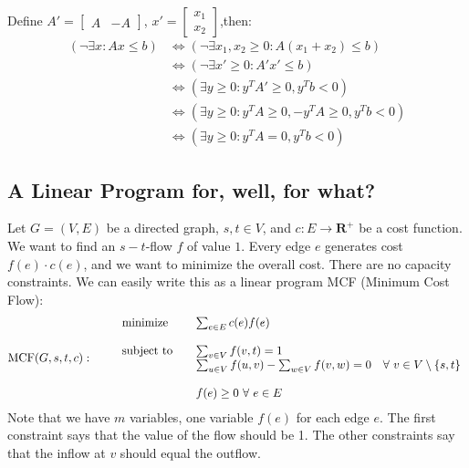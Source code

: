 \documentclass[11pt,a4paper,oneside]{article}
\newcommand{\x}{\mathbf{x}}
\begin{document}
\begin{problem}{1}
	Define $A'=\begin{bmatrix}A & -A\end{bmatrix}$,
	$x'=\begin{bmatrix}x_1\\x_2\end{bmatrix}$,then:
	\begin{align*}
	(\neg\exists x:Ax\leq b)
	& \Longleftrightarrow (\neg\exists x_1,x_2\geq 0:A(x_1+x_2)\leq b)\\
	& \Longleftrightarrow (\neg\exists x'\geq 0:A'x'\leq b)\\
	& \Longleftrightarrow (\exists y\geq 0:y^TA'\geq 0,y^Tb<0)\\
	& \Longleftrightarrow (\exists y\geq 0:y^TA\geq 0,-y^TA\geq 0,y^Tb<0)\\
	& \Longleftrightarrow (\exists y\geq 0:y^TA= 0,y^Tb<0)
	\end{align*}
\end{problem}

\subsection{A Linear Program for, well, for what?}

Let $G = (V,E)$ be a directed graph, $s,t \in V$,  and $c: E \rightarrow \mathbf{R}^+$ be a cost 
function. We want to find an $s-t$-flow $f$ of value $1$. Every edge $e$ generates cost $f(e) \cdot c(e)$, and we want to minimize the overall cost. There are no capacity constraints.
We can easily write this as a linear program MCF (Minimum Cost Flow):
\begin{align*}
  \textrm{MCF}(G,s,t,c): \qquad
  \begin{array}{ll}
    \textnormal{minimize} \quad & \multicolumn{1}{l}{\sum_{e \in E} c(e) f(e)} \\
    \\
    \textnormal{subject to} \quad & \sum_{v \in V} f(v,t)  = 1 \\
					        & \sum_{u \in V} f(u,v) - \sum_{w \in V} f(v,w)  = 0  \quad \forall\ v \in V  \setminus \{s,t\}\\
					        \\
     & f(e)  \geq 0 \ \forall \ e \in E 
  \end{array}
\end{align*}
Note that we have $m$ variables, one variable $f(e)$ for each edge $e$.
The first constraint says that the value of the flow should be 1. The other constraints say that 
the inflow at $v$ should equal the outflow.
\end{document}

